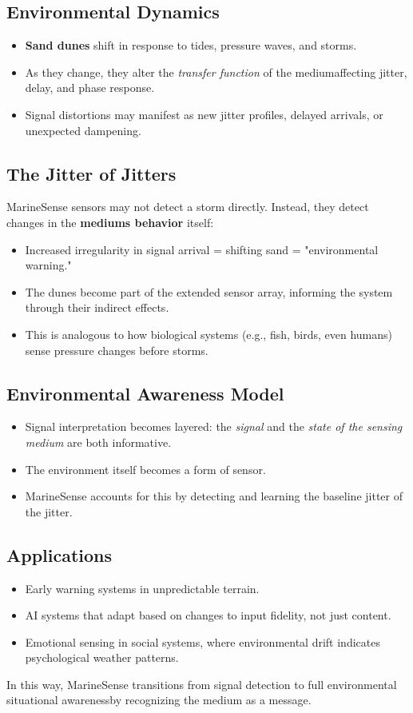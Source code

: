 \documentclass[11pt]{article}
\begin{document}
\subsection{Environmental Dynamics}
\begin{itemize}
  \item \textbf{Sand dunes} shift in response to tides, pressure waves, and storms.
  \item As they change, they alter the \textit{transfer function} of the mediumaffecting jitter, delay, and phase response.
  \item Signal distortions may manifest as new jitter profiles, delayed arrivals, or unexpected dampening.
\end{itemize}

\subsection{The Jitter of Jitters}
MarineSense sensors may not detect a storm directly. Instead, they detect changes in the \textbf{mediums behavior} itself:
\begin{itemize}
  \item Increased irregularity in signal arrival = shifting sand = "environmental warning."
  \item The dunes become part of the extended sensor array, informing the system through their indirect effects.
  \item This is analogous to how biological systems (e.g., fish, birds, even humans) sense pressure changes before storms.
\end{itemize}

\subsection{Environmental Awareness Model}
\begin{itemize}
  \item Signal interpretation becomes layered: the \textit{signal} and the \textit{state of the sensing medium} are both informative.
  \item The environment itself becomes a form of sensor.
  \item MarineSense accounts for this by detecting and learning the baseline jitter of the jitter.
\end{itemize}

\subsection{Applications}
\begin{itemize}
  \item Early warning systems in unpredictable terrain.
  \item AI systems that adapt based on changes to input fidelity, not just content.
  \item Emotional sensing in social systems, where environmental drift indicates psychological weather patterns.
\end{itemize}

In this way, MarineSense transitions from signal detection to full environmental situational awarenessby recognizing the medium as a message.
\end{document}
